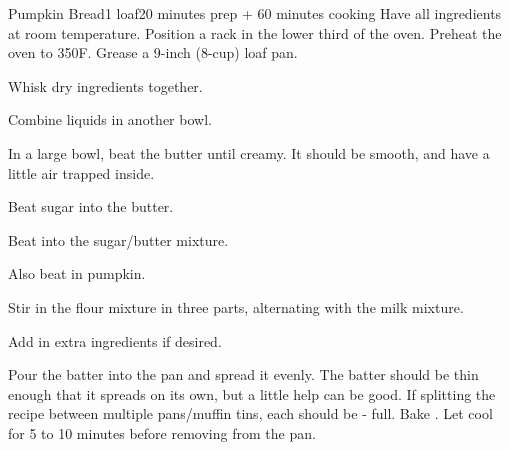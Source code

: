 \documentclass[../Cookbook.tex]{subfiles}
\begin{document}
\begin{recipe}{Pumpkin Bread}{1 loaf}{20 minutes prep + 60 minutes cooking}
	Have all ingredients at room temperature. Position a rack in the lower third of the oven. Preheat the oven to 350\0F. Grease a 9-inch (8-cup) loaf pan.

	Whisk dry ingredients together.

	Combine liquids in another bowl.

	In a large bowl, beat the butter until creamy. It should be smooth, and have a little air trapped inside.

	Beat sugar into the butter.

	Beat into the sugar/butter mixture.

	Also beat in pumpkin.

	\newstep
	Stir in the flour mixture in three parts, alternating with the milk mixture.

	Add in extra ingredients if desired.

	\newstep
	Pour the batter into the pan and spread it evenly. The batter should be thin enough that it spreads on its own, but a little help can be good. If splitting the recipe between multiple pans/muffin tins, each should be - full.
	Bake . Let cool for 5 to 10 minutes before removing from the pan.
\end{recipe}
\end{document}
